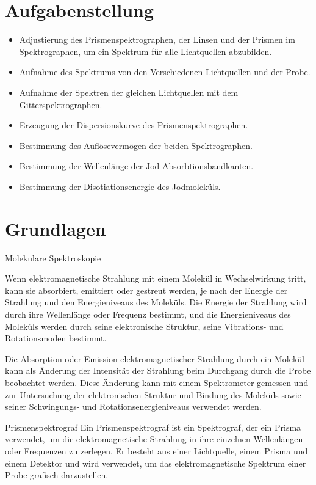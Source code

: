 \documentclass[12pt,english,ngerman]{scrartcl}
\begin{document}
\section{Aufgabenstellung\label{sec:Aufgabenstellung}}

\begin{itemize}
	\item Adjustierung des Prismenspektrographen, der Linsen und der Prismen im Spektrographen, um ein Spektrum für alle 
	Lichtquellen abzubilden.
	\item Aufnahme des Spektrums von den Verschiedenen Lichtquellen und der Probe.
	\item Aufnahme der Spektren der gleichen Lichtquellen mit dem Gitterspektrographen.
	\item Erzeugung der Dispersionskurve des Prismenspektrographen.
	\item Bestimmung des Auflösevermögen der beiden Spektrographen.
	\item Bestimmung der Wellenlänge der Jod-Absorbtionsbandkanten.
	\item Bestimmung der Disotiationsenergie des Jodmoleküls.
\end{itemize}

\section{Grundlagen}\label{sec:Grund}


Molekulare Spektroskopie

Wenn elektromagnetische Strahlung mit einem Molekül in Wechselwirkung tritt, kann sie absorbiert, emittiert oder gestreut werden, je nach der Energie der Strahlung und den Energieniveaus des Moleküls. Die Energie der Strahlung wird durch ihre Wellenlänge oder Frequenz bestimmt, und die Energieniveaus des Moleküls werden durch seine elektronische Struktur, seine Vibrations- und Rotationsmoden bestimmt.

Die Absorption oder Emission elektromagnetischer Strahlung durch ein Molekül kann als Änderung der Intensität der Strahlung beim Durchgang durch die Probe beobachtet werden. Diese Änderung kann mit einem Spektrometer gemessen und zur Untersuchung der elektronischen Struktur und Bindung des Moleküls sowie seiner Schwingungs- und Rotationsenergieniveaus verwendet werden.

Prismenspektrograf
Ein Prismenspektrograf ist ein Spektrograf, der ein Prisma verwendet, um die elektromagnetische Strahlung in ihre einzelnen Wellenlängen oder Frequenzen zu zerlegen. Er besteht aus einer Lichtquelle, einem Prisma und einem Detektor und wird verwendet, um das elektromagnetische Spektrum einer Probe grafisch darzustellen.
\end{document}
